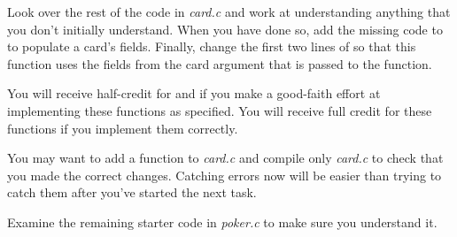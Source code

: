 Look over the rest of the code in \textit{card.c} and work at understanding anything that you don't initially understand.
When you have done so, add the missing code to  to populate a card's fields.
Finally, change the first two lines of  so that this function uses the fields from the card argument that is passed to the function.

You will receive half-credit for  and  if you make a good-faith effort at implementing these functions as specified.
You will receive full credit for these functions if you implement them correctly.

You may want to add a  function to \textit{card.c} and compile only \textit{card.c} to check that you made the correct changes.
Catching errors now will be easier than trying to catch them after you've started the next task.

Examine the remaining starter code in \textit{poker.c} to make sure you understand it.
